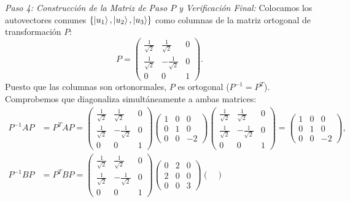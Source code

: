 \begin{ejemplobox}
    \textit{Paso 4: Construcción de la Matriz de Paso $P$ y Verificación Final:}
    Colocamos los autovectores comunes $\{\left| u_1 \right\rangle, \left| u_2 \right\rangle, \left| u_3 \right\rangle\}$ como columnas de la matriz ortogonal de transformación $P$:
    \begin{equation}
        P = \begin{pmatrix}
            \frac{1}{\sqrt{2}} & \frac{1}{\sqrt{2}} & 0 \\
            \frac{1}{\sqrt{2}} & -\frac{1}{\sqrt{2}} & 0 \\
            0 & 0 & 1
        \end{pmatrix}.
    \end{equation}
    Puesto que las columnas son ortonormales, $P$ es ortogonal ($P^{-1} = P^T$). Comprobemos que diagonaliza simultáneamente a ambas matrices:
    \begin{align}
        P^{-1} A P &= P^T A P = \begin{pmatrix}
            \frac{1}{\sqrt{2}} & \frac{1}{\sqrt{2}} & 0 \\
            \frac{1}{\sqrt{2}} & -\frac{1}{\sqrt{2}} & 0 \\
            0 & 0 & 1
        \end{pmatrix} \begin{pmatrix} 1 & 0 & 0 \\ 0 & 1 & 0 \\ 0 & 0 & -2 \end{pmatrix} \begin{pmatrix}
            \frac{1}{\sqrt{2}} & \frac{1}{\sqrt{2}} & 0 \\
            \frac{1}{\sqrt{2}} & -\frac{1}{\sqrt{2}} & 0 \\
            0 & 0 & 1
        \end{pmatrix} = \begin{pmatrix} 1 & 0 & 0 \\ 0 & 1 & 0 \\ 0 & 0 & -2 \end{pmatrix}, \\
        P^{-1} B P &= P^T B P = \begin{pmatrix}
            \frac{1}{\sqrt{2}} & \frac{1}{\sqrt{2}} & 0 \\
            \frac{1}{\sqrt{2}} & -\frac{1}{\sqrt{2}} & 0 \\
            0 & 0 & 1
        \end{pmatrix} \begin{pmatrix} 0 & 2 & 0 \\ 2 & 0 & 0 \\ 0 & 0 & 3 \end{pmatrix} \begin{pmatrix}

\end{pmatrix}
\end{align}
\end{ejemplobox}

